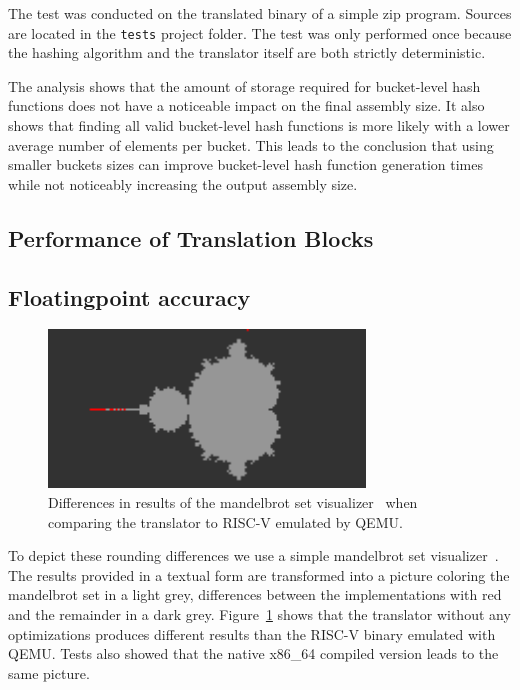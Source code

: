 \documentclass[course=eragp]{aspdoc}
\begin{document}
\par

The test was conducted on the translated binary of a simple zip program. Sources are located in the
\texttt{tests} project folder. The test was only performed once because the hashing algorithm and
the translator itself are both strictly deterministic.

\par

The analysis shows that
the amount of storage required for bucket-level hash functions does not have a noticeable impact on
the final assembly size. It also shows that finding all valid bucket-level hash functions is more
likely with a lower average number of elements per bucket. This leads to the conclusion that using
smaller buckets sizes can improve bucket-level hash function generation times while not noticeably
increasing the output assembly size.

\subsection{Performance of Translation Blocks}

\subsection{Floatingpoint accuracy}

\begin{figure}[H]
    \centering
    \includegraphics[width=0.75\textwidth]{images/mandelbrot_differences/translated_diff.png}
    \caption{Differences in results of the mandelbrot set visualizer~\cite{mandelbrot_program} when
        comparing the translator to RISC-V emulated by QEMU.}\label{fig:mandelbrot_diff_translator}
\end{figure}

To depict these rounding differences we use a simple mandelbrot set
visualizer~\cite{mandelbrot_program}. The results provided in a textual form are transformed into a
picture coloring the mandelbrot set in a light grey, differences between the implementations with
red and the remainder in a dark grey. Figure~\ref{fig:mandelbrot_diff_translator} shows that the
translator without any optimizations produces different results than the RISC-V binary emulated with
QEMU. Tests also showed that the native x86\_64 compiled version leads to the same picture.
\end{document}
